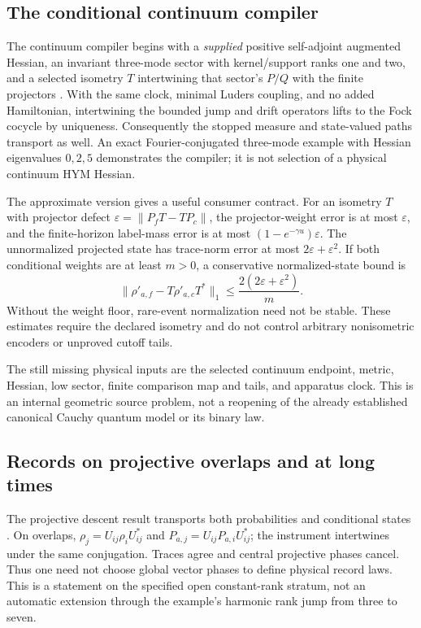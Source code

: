 \documentclass[11pt]{article}
\begin{document}
\subsection{The conditional continuum compiler}
\label{sec:continuum-recorder}
The continuum compiler begins with a \emph{supplied} positive self-adjoint
augmented Hessian, an invariant three-mode sector with kernel/support ranks
one and two, and a selected isometry \(T\) intertwining that sector's
\(P/Q\) with the finite projectors \cite{FrozenContinuum}. With the same
clock, minimal Luders coupling, and no added Hamiltonian, intertwining the
bounded jump and drift operators lifts to the Fock cocycle by uniqueness.
Consequently the stopped measure and state-valued paths transport as well.
An exact Fourier-conjugated three-mode example with Hessian eigenvalues
\(0,2,5\) demonstrates the compiler; it is not selection of a physical
continuum HYM Hessian.

The approximate version gives a useful consumer contract. For an isometry
\(T\) with projector defect
\(\varepsilon=\|P_fT-TP_c\|\), the projector-weight error is at most
\(\varepsilon\), and the finite-horizon label-mass error is at most
\((1-e^{-\gamma u})\varepsilon\). The unnormalized projected state has
trace-norm error at most \(2\varepsilon+\varepsilon^2\). If both conditional
weights are at least \(m>0\), a conservative normalized-state bound is
\[
\|\rho'_{a,f}-T\rho'_{a,c}T^*\|_1
\leq \frac{2(2\varepsilon+\varepsilon^2)}{m}.
\]
Without the weight floor, rare-event normalization need not be stable.
These estimates require the declared isometry and do not control arbitrary
nonisometric encoders or unproved cutoff tails.

The still missing physical inputs are the selected continuum endpoint,
metric, Hessian, low sector, finite comparison map and tails, and apparatus
clock. This is an internal geometric source problem, not a reopening of the
already established canonical Cauchy quantum model or its binary law.

\subsection{Records on projective overlaps and at long times}
\label{sec:projective-records}
The projective descent result transports both probabilities and conditional
states \cite{FrozenProjectiveRecords}. On overlaps,
\(\rho_j=U_{ij}\rho_iU_{ij}^*\) and
\(P_{a,j}=U_{ij}P_{a,i}U_{ij}^*\); the instrument intertwines under the same
conjugation. Traces agree and central projective phases cancel. Thus one
need not choose global vector phases to define physical record laws.
This is a statement on the specified open constant-rank stratum, not an
automatic extension through the example's harmonic rank jump from three
to seven.
\end{document}
